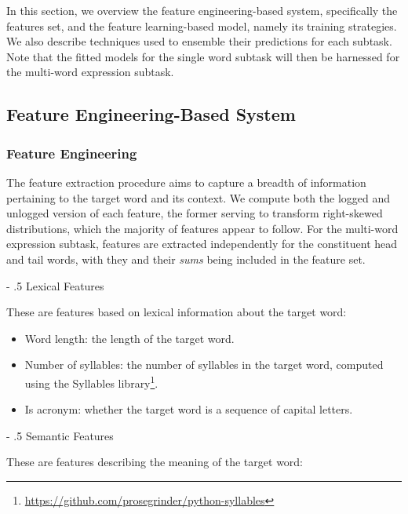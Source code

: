 \documentclass[11pt,a4paper]{article}
\makeatletter
\renewcommand\paragraph{%
    \@startsection{paragraph}{4}{0mm}%
        {-\baselineskip}%
        {.5\baselineskip}%
        {\normalfont\normalsize\bfseries}}
\makeatother
\begin{document}
In this section, we overview the feature engineering-based system, specifically the features set, and the feature learning-based model, namely its training strategies. We also describe techniques used to ensemble their predictions for each subtask. Note that the fitted models for the single word subtask will then be harnessed for the multi-word expression subtask.

\subsection{Feature Engineering-Based System}

\subsubsection{Feature Engineering}

The feature extraction procedure aims to capture a breadth of information pertaining to the target word and its context. We compute both the logged and unlogged version of each feature, the former serving to transform right-skewed distributions, which the majority of features appear to follow. For the multi-word expression subtask, features are extracted independently for the constituent head and tail words, with they and their \textit{sums} being included in the feature set.

\paragraph{Lexical Features}

These are features based on lexical information about the target word:

\begin{itemize}
  \item Word length: the length of the target word.
  \item Number of syllables: the number of syllables in the target word, computed using the Syllables library\footnote{\url{https://github.com/prosegrinder/python-syllables}}.
  \item Is acronym: whether the target word is a sequence of capital letters.
\end{itemize}
  
\paragraph{Semantic Features}

These are features describing the meaning of the target word:
\end{document}
